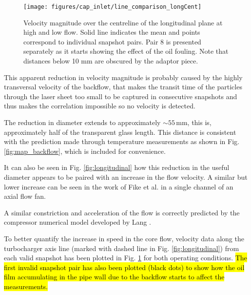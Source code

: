 \begin{figure}[t!]
\centering
\texttt{[image: figures/cap\_inlet/line\_comparison\_longCent]}
\caption{Velocity magnitude over the centreline of the longitudinal plane at high and low flow. Solid line indicates the mean and points correspond to individual snapshot pairs. Pair 8 is presented separately as it starts showing the effect of the oil fouling. Note that distances below 10 mm are obscured by the adaptor piece.}
\label{fig:line_comp_long}
\end{figure} 


This apparent reduction in velocity magnitude is probably caused by  the highly transversal velocity of the backflow, that makes the transit time of the particles through the laser sheet too small to be captured in consecutive snapshots and thus makes the correlation impossible so no velocity is detected.

The reduction in diameter extends to approximately $\sim 55\,$mm, this is, approximately half of the transparent glass length. This distance is consistent with the prediction made through temperature measurements as shown in Fig. \ref{fig:map_backflow}, which is included for convenience.

It can also be seen in Fig. \ref{fig:longitudinal} how this reduction in the useful diameter appears to be paired with an increase in the flow velocity. A similar but lower increase can be seen in the work of Fike et al. \cite{fike2014visualisation} in a single channel of an axial flow fan.

A similar constriction and acceleration of the flow is correctly predicted by the compressor numerical model developed by Lang \cite{lang2011contribucion}.

To better quantify the increase in speed in the core flow, velocity data along the turbocharger axis line (marked with dashed line in Fig. \ref{fig:longitudinal}) from each valid snapshot has been plotted in Fig. \ref{fig:line_comp_long} for both operating conditions. \hl{The first invalid snapshot pair has also been plotted (black dots) to show how the oil film accumulating in the pipe wall due to the backflow starts to affect the measurements.}


